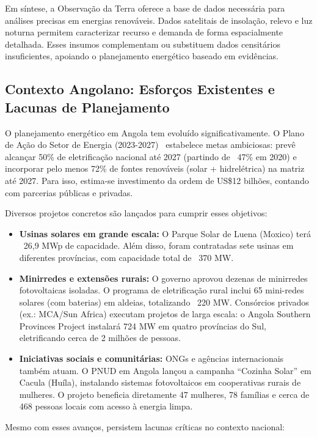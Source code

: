 \documentclass[12pt, a4paper]{article}
\begin{document}
Em síntese, a Observação da Terra oferece a base de dados necessária para análises precisas em energias renováveis. Dados satelitais de insolação, relevo e luz noturna permitem caracterizar recurso e demanda de forma espacialmente detalhada. Esses insumos complementam ou substituem dados censitários insuficientes, apoiando o planejamento energético baseado em evidências.

\subsection{Contexto Angolano: Esforços Existentes e Lacunas de Planejamento}

O planejamento energético em Angola tem evoluído significativamente. O Plano de Ação do Setor de Energia (2023-2027)~\citep{governo_angola_2022} estabelece metas ambiciosas: prevê alcançar 50\% de eletrificação nacional até 2027 (partindo de ~47\% em 2020) e incorporar pelo menos 72\% de fontes renováveis (solar + hidrelétrica) na matriz até 2027. Para isso, estima-se investimento da ordem de US\$12 bilhões, contando com parcerias públicas e privadas.

Diversos projetos concretos são lançados para cumprir esses objetivos:

\begin{itemize}
\item \textbf{Usinas solares em grande escala:} O Parque Solar de Luena (Moxico) terá ~26,9 MWp de capacidade. Além disso, foram contratadas sete usinas em diferentes províncias, com capacidade total de ~370 MW.
\item \textbf{Minirredes e extensões rurais:} O governo aprovou dezenas de minirredes fotovoltaicas isoladas. O programa de eletrificação rural inclui 65 mini-redes solares (com baterias) em aldeias, totalizando ~220 MW. Consórcios privados (ex.: MCA/Sun Africa) executam projetos de larga escala: o Angola Southern Provinces Project instalará 724 MW em quatro províncias do Sul, eletrificando cerca de 2 milhões de pessoas.
\item \textbf{Iniciativas sociais e comunitárias:} ONGs e agências internacionais também atuam. O PNUD em Angola lançou a campanha ``Cozinha Solar'' em Cacula (Huíla), instalando sistemas fotovoltaicos em cooperativas rurais de mulheres. O projeto beneficia diretamente 47 mulheres, 78 famílias e cerca de 468 pessoas locais com acesso à energia limpa.
\end{itemize}

Mesmo com esses avanços, persistem lacunas críticas no contexto nacional:
\end{document}
